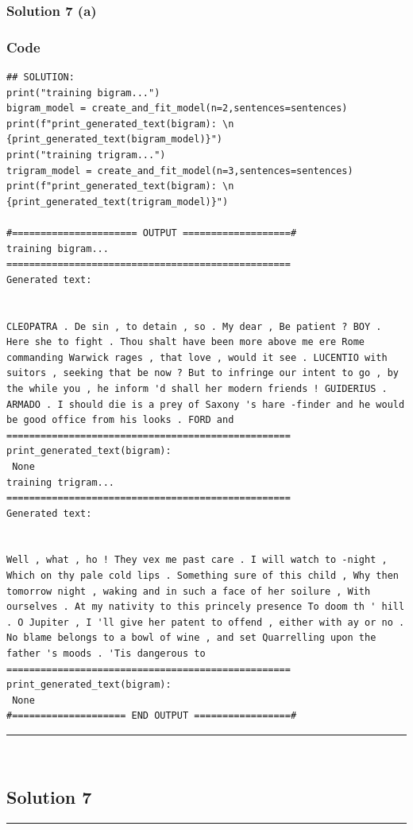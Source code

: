\documentclass{article}
\begin{document}
\subsubsection*{Solution 7 (a)}
\subsubsection*{Code}
\begin{lstlisting}
## SOLUTION:
print("training bigram...")
bigram_model = create_and_fit_model(n=2,sentences=sentences)
print(f"print_generated_text(bigram): \n {print_generated_text(bigram_model)}")
print("training trigram...")
trigram_model = create_and_fit_model(n=3,sentences=sentences)
print(f"print_generated_text(bigram): \n {print_generated_text(trigram_model)}")

#====================== OUTPUT ===================# 
training bigram...
==================================================
Generated text:


CLEOPATRA . De sin , to detain , so . My dear , Be patient ? BOY . Here she to fight . Thou shalt have been more above me ere Rome commanding Warwick rages , that love , would it see . LUCENTIO with suitors , seeking that be now ? But to infringe our intent to go , by the while you , he inform 'd shall her modern friends ! GUIDERIUS . ARMADO . I should die is a prey of Saxony 's hare -finder and he would be good office from his looks . FORD and
==================================================
print_generated_text(bigram): 
 None
training trigram...
==================================================
Generated text:


Well , what , ho ! They vex me past care . I will watch to -night , Which on thy pale cold lips . Something sure of this child , Why then tomorrow night , waking and in such a face of her soilure , With ourselves . At my nativity to this princely presence To doom th ' hill . O Jupiter , I 'll give her patent to offend , either with ay or no . No blame belongs to a bowl of wine , and set Quarrelling upon the father 's moods . 'Tis dangerous to
==================================================
print_generated_text(bigram): 
 None
#==================== END OUTPUT =================#
\end{lstlisting}


\noindent\rule{\textwidth}{0.4pt}\\

\newpage

\subsection*{Solution 7}
\noindent\rule{\textwidth}{0.4pt}\\
\end{document}
